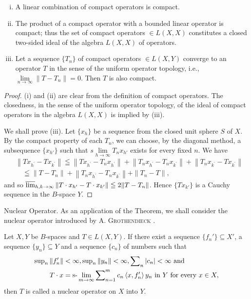 \begin{theoremu}
 \begin{enumerate}[(i)]
\item A linear combination of compact operators is compact.
\item The product of a compact operator with a bounded linear operator is compact; thus the set of compact operators $\in L(X, X)$ constitutes a closed two-sided ideal of the algebra $L(X, X)$ of operators.
\item Let a sequence $\{T_n\}$ of compact operators $\in L(X, Y)$ converge to an operator $T$ in the sense of the uniform operator topology, i.e., $\lim\limits_{n \to \infty} \|T - T_n\| = 0$. Then $T$ is also compact.
\end{enumerate}
\end{theoremu}

\begin{proof}
 (i) and (ii) are clear from the definition of compact operators. The closedness, in the sense of the uniform operator topology, of the ideal of compact operators in the algebra $L(X, X)$ is implied by (iii). 

We shall prove (iii). Let $\{x_h\}$ be a sequence from the closed unit sphere $S$ of $X$. By the compact property of each $T_n$, we can choose, by the diagonal method, a subsequence $\{x_{h'}\}$ such that $s\lim\limits_{h\to \infty}T_n x_{h'}$ exists for every fixed $n$. We have 
\[
\begin{aligned} & {\left\| T x _{h ^{\prime}} - T x _{k ^{\prime}} \right\| \leqq \left\| T x _{h ^{\prime}} - T _{n} x _{h ^{\prime}} \right\| + \left\| T _{n} x _{h ^{\prime}} - T _{n} x _{k ^{\prime}} \right\| + \left\| T _{n} x _{k ^{\prime}} - T x _{k ^{\prime}} \right\|} \\ & {\quad \leqq \| T - T _{n} \| + \left\| T _{n} x _{h ^{\prime}} - T _{n} x _{k ^{\prime}} \right\| + \| T _{n} - T \|,} \end{aligned}
\]
and so $\varlimsup\limits_{h,k\to\infty}\left\|T\cdot x_{h'}-T\cdot x_{k'}\right\|\leqq 2\|T-T_n\|$. Hence $\{Tx_{k'}\}$ is a Cauchy sequence in the $B$-space $Y$. 
\end{proof}

Nuclear Operator. As an application of the Theorem, we shall consider the nuclear operator introduced by A. \textsc{Grothendieck} \cite{grothendieck88}. 

\begin{definition}\label{def:X.2.Definition.2} Let $X, Y$ be $B$-spaces and $T \in L(X, Y)$. If there exist a sequence $\{f_n'\} \subseteq X'$, a sequence $\{y_n\} \subseteq Y$ and a sequence $\{c_n\}$ of numbers such that 
\begin{align}
\sup\limits _{n} \left\| f _{n} ^{\prime} \right\|& < \infty , \sup\limits _{n} \left\| y _{n} \right\| < \infty , \sum\limits_{n} \left| c _{n} \right| < \infty \text{ and } \notag \\
T \cdot x& = \slim _{m \rightarrow \infty} \sum\limits_{n=1} ^{m} c _{n} \left\langle x, f _{n} ^{\prime} \right\rangle y _{n} \text{ in } Y \text{ for every } x \in X, \label{eq:X.2.6}
\end{align}
then $T$ is called a nuclear operator on $X$ into $Y$. 
\end{definition}

